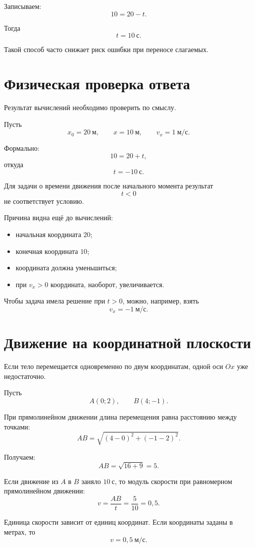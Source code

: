 \documentclass[a4paper,12pt]{article}
\begin{document}
Записываем:
\[
10=20-t.
\]

Тогда
\[
t=10~\text{с}.
\]

Такой способ часто снижает риск ошибки при переносе слагаемых.

\section{Физическая проверка ответа}

Результат вычислений необходимо проверить по смыслу.

Пусть
\[
x_0=20~\text{м},\qquad
x=10~\text{м},\qquad
v_x=1~\text{м/с}.
\]

Формально:
\[
10=20+t,
\]
откуда
\[
t=-10~\text{с}.
\]

Для задачи о времени движения после начального момента результат
\[
t<0
\]
не соответствует условию.

Причина видна ещё до вычислений:

\begin{itemize}
  \item начальная координата \(20\);
  \item конечная координата \(10\);
  \item координата должна уменьшиться;
  \item при \(v_x>0\) координата, наоборот, увеличивается.
\end{itemize}

Чтобы задача имела решение при \(t>0\), можно, например, взять
\[
v_x=-1~\text{м/с}.
\]

\section{Движение на координатной плоскости}

Если тело перемещается одновременно по двум координатам, одной оси \(Ox\) уже недостаточно.

Пусть
\[
A(0;2),\qquad B(4;-1).
\]

При прямолинейном движении длина перемещения равна расстоянию между точками:
\[
AB=\sqrt{(4-0)^2+(-1-2)^2}.
\]

Получаем:
\[
AB=\sqrt{16+9}=5.
\]

Если движение из \(A\) в \(B\) заняло \(10~\text{с}\), то модуль скорости при равномерном прямолинейном движении:
\[
v=\frac{AB}{t}=\frac5{10}=0,5.
\]

Единица скорости зависит от единиц координат. Если координаты заданы в метрах, то
\[
v=0,5~\text{м/с}.
\]
\end{document}
